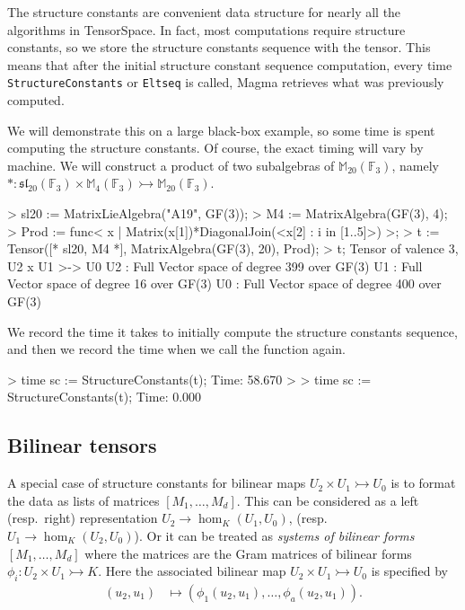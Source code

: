 \begin{example}[SCStored]

The structure constants are convenient data structure for nearly all the
algorithms in TensorSpace. In fact, most computations require structure
constants, so we store the structure constants sequence with the tensor. This
means that after the initial structure constant sequence computation, every time
\texttt{StructureConstants} or \texttt{Eltseq} is called, \textsf{Magma} retrieves what
was previously computed. 

We will demonstrate this on a large black-box example, so some time is spent
computing the structure constants. Of course, the exact timing will vary by
machine. We will construct a product of two subalgebras of
$\mathbb{M}_{20}(\mathbb{F}_3)$, namely $* :
\mathfrak{sl}_{20}(\mathbb{F}_3)\times \mathbb{M}_4(\mathbb{F}_3)\rightarrowtail
\mathbb{M}_{20}(\mathbb{F}_3)$.

\begin{code}
> sl20 := MatrixLieAlgebra("A19", GF(3));
> M4 := MatrixAlgebra(GF(3), 4);
> Prod := func< x | Matrix(x[1])*DiagonalJoin(<x[2] : i in [1..5]>) >;
> t := Tensor([* sl20, M4 *], MatrixAlgebra(GF(3), 20), Prod);
> t;
Tensor of valence 3, U2 x U1 >-> U0
U2 : Full Vector space of degree 399 over GF(3)
U1 : Full Vector space of degree 16 over GF(3)
U0 : Full Vector space of degree 400 over GF(3)
\end{code}

We record the time it takes to initially compute the structure constants
sequence, and then we record the time when we call the function again.
\begin{code}
> time sc := StructureConstants(t);
Time: 58.670
> 
> time sc := StructureConstants(t);
Time: 0.000
\end{code}
\end{example}





\subsection{Bilinear tensors}
A special case of structure constants for bilinear maps $U_2\times
U_1\rightarrowtail U_0$ is to format the data as lists of matrices $[M_1,\dots,
M_d]$. This can be considered as a left (resp.~right) representation $U_2\to
\hom_K(U_1,U_0)$, (resp.~$U_1\to \hom_K(U_2,U_0)$). Or it can be treated as {\em
systems of bilinear forms} $[M_1,\dots,M_d]$ where the matrices are the Gram
matrices of bilinear forms $\phi_i:U_2\times U_1\rightarrowtail K$. Here the
associated bilinear map $U_2\times U_1\rightarrowtail U_0$ is specified by
\begin{align*}
	(u_2,u_1) & \mapsto ( \phi_1(u_2,u_1),\dots, \phi_a(u_2,u_1)).
\end{align*}

